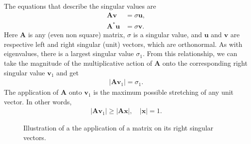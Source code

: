 The equations that describe the singular values are
\begin{subequations}
\begin{align}
  \mathbf{A v} &= \sigma \mathbf{u}, \\
  \mathbf{A}^* \mathbf{u} &= \sigma \mathbf{v} .
\end{align}
\end{subequations}
Here $\mathbf{A}$ is any (even non square) matrix, $\sigma$ is a singular value, and $\mathbf{u}$ and $\mathbf{v}$ are respective left and right singular (unit) vectors, which are orthonormal. As with eigenvalues, there is a largest singular value $\sigma_1$. From this relationship, we can take the magnitude of the multiplicative action of $\mathbf{A}$ onto the corresponding right singular value $\mathbf{v}_1$ and get
\begin{align}
  | \mathbf{A v}_1 | = \sigma_1 .
\end{align}
The application of $\mathbf{A}$ onto $\mathbf{v}_1$ is the maximum possible stretching of any unit vector. In other words,
\begin{align}
  | \mathbf{A v}_1 | \ge | \mathbf{A x} | , \quad | \mathbf{x} | = 1 .
\end{align}

\begin{figure}[tb!]
\begin{center}
\caption{Illustration of a the application of a matrix on its right singular vectors.}
\label{Fig:linearAlgebra_illustrationSingularVectors}
\end{center}
\end{figure}

